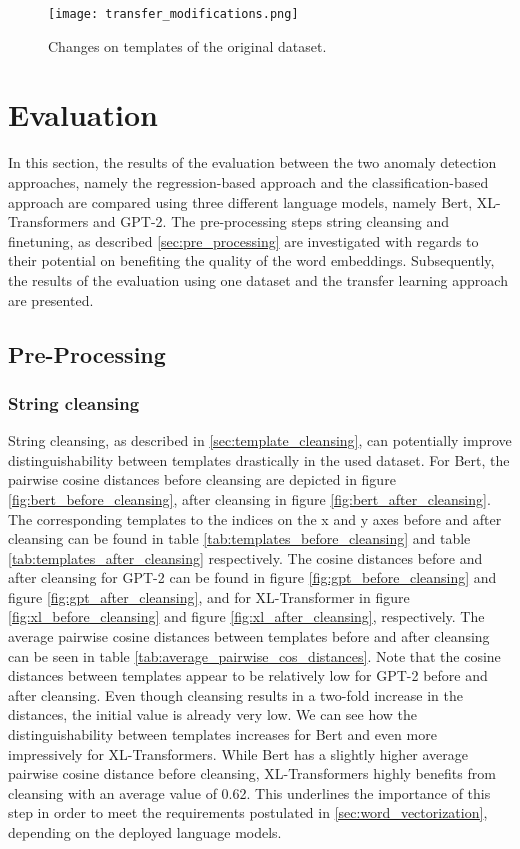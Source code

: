 \begin{figure}[H]
  \centering
  \texttt{[image: transfer\_modifications.png]}\\
  \caption{Changes on templates of the original dataset.}
  \label{fig:transfer_modifications}
\end{figure}




\section{Evaluation\label{sec:evaluation}}
In this section, the results of the evaluation between the two anomaly detection approaches, namely the regression-based approach and the classification-based approach are compared using three different language models, namely Bert, XL-Transformers and GPT-2. The pre-processing steps string cleansing and finetuning, as described \ref{sec:pre_processing} are investigated with regards to their potential on benefiting the quality of the word embeddings. Subsequently, the results of the evaluation using one dataset and the transfer learning approach are presented.
\subsection{Pre-Processing}
\subsubsection{String cleansing}
String cleansing, as described in \ref{sec:template_cleansing}, can potentially  improve distinguishability between templates drastically in the used dataset.
For Bert, the pairwise cosine distances before cleansing are depicted in figure \ref{fig:bert_before_cleansing}, after cleansing in figure \ref{fig:bert_after_cleansing}. The corresponding templates to the indices on the x and y axes before and after cleansing can be found in table \ref{tab:templates_before_cleansing} and table \ref{tab:templates_after_cleansing} respectively.
The cosine distances before and after cleansing for GPT-2 can be found in figure \ref{fig:gpt_before_cleansing} and figure \ref{fig:gpt_after_cleansing}, and for XL-Transformer in figure \ref{fig:xl_before_cleansing} and figure \ref{fig:xl_after_cleansing}, respectively. The average pairwise cosine distances between templates before and after cleansing can be seen in table \ref{tab:average_pairwise_cos_distances}.
Note that the cosine distances between templates appear to be relatively low for GPT-2 before and after cleansing. Even though cleansing results in a two-fold increase in the distances, the initial value is already very low. We can see how the distinguishability between templates increases for Bert and even more impressively for XL-Transformers. While Bert has a slightly higher average pairwise cosine distance before cleansing, XL-Transformers highly benefits from cleansing with an average value of 0.62. This underlines the importance of this step in order to meet the requirements postulated in \ref{sec:word_vectorization}, depending on the deployed language models.



